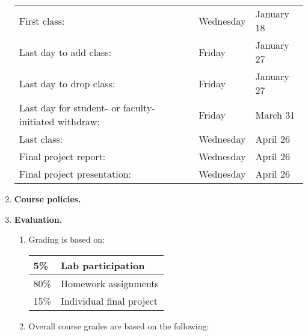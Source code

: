 \documentclass[10pt,titlepage,fleqn]{article}
\begin{document}
\begin{enumerate}
\begin{tabular}{lll}
\hline
First class:                                        & Wednesday & January 18 \\
Last day to add class:                              & Friday & January 27 \\
Last day to drop class:                             & Friday & January 27 \\
Last day for student- or faculty-initiated withdraw: & Friday & March 31 \\
Last class:                                         & Wednesday & April 26 \\
Final project report:                               & Wednesday & April 26 \\
Final project presentation:                         & Wednesday & April 26 \\
\hline
\end{tabular}

\item {\bf Course policies.}



\item {\bf Evaluation.}

\begin{enumerate}

\item Grading is based on:

\begin{tabular}{|l|l|}
\hline
5\% & Lab participation \\ \hline
80\% & Homework assignments \\ \hline
15\% & Individual final project \\ \hline
\end{tabular}

\bigskip
\item Overall course grades are based on the following:


\end{enumerate}
\end{enumerate}
\end{document}

